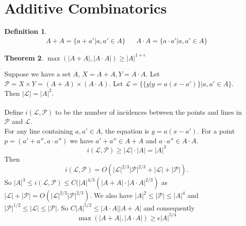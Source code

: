 \documentclass[a4paper]{article}
\newtheorem{thm}{Theorem}[section]
\newtheorem{defn}[thm]{Definition}
\begin{document}
\section*{Additive Combinatorics}
\begin{defn}
    \begin{align*}
        A+A=\{a+a' | a,a'\in A\} && A\cdot A = \{a\cdot a'| a,a'\in A\}
    \end{align*}
\end{defn}
\begin{thm}
    $\max(|A+A|,|A\cdot A|)\geq |A|^{1+\epsilon}$
\end{thm}
\noindent Suppose we have a set $A$, $X=A+A, Y=A\cdot A$. Let $\mathcal{P}=X\times Y=(A+A)\times (A\cdot A)$. Let $\mathcal{L}=\{\{y | y=a(x-a')\} | a,a'\in A\}$. Then $|\mathcal{L}|=|A|^2.$ \\\\
Define $i(\mathcal{L}, \mathcal{P})$ to be the number of incidences between the points and lines in $\mathcal{P}$ and $\mathcal{L}$.  \\
For any line containing $a, a'\in A$, the equation is $y=a(x-a')$. For a point $p=(a'+a'',a\cdot a'')$ we have $a'+a''\in A+A$ and $a\cdot a''\in A\cdot A.$ $$i(\mathcal{L}, \mathcal{P})\geq |\mathcal{L}|\cdot |A|=|A|^3$$
Then $$i(\mathcal{L}, \mathcal{P})=O(|\mathcal{L}|^{2/3}|\mathcal{P}|^{2/3}+|\mathcal{L}|+|\mathcal{P}|).$$
So $|A|^3\leq i(\mathcal{L}, \mathcal{P})\leq C(|A|^{4/3}(|A+A|\cdot |A\cdot A|^{2/3})$ as $|\mathcal{L}|+|\mathcal{P}|=O(|\mathcal{L}|^{2/3}|\mathcal{P}|^{2/3})$.
We also have $|A|^2\leq |\mathcal{P}|\leq |A|^4$ and $|\mathcal{P}|^{1/2}\leq |\mathcal
L|\leq |\mathcal{P}|$. So $C|A|^{5/2}\leq |A\cdot A||A+A|$ and consequently $$\max(|A+A|,|A\cdot A|)\geq \epsilon |A|^{5/4}$$
\end{document}
